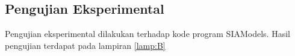 \subsection{Pengujian Eksperimental}
\label{sec:pengujian eksperimental}
Pengujian eksperimental dilakukan terhadap kode program SIAModels. Hasil pengujian terdapat pada lampiran \ref{lamp:B}%

%
%
%
%
%
